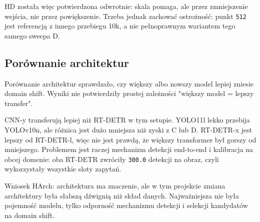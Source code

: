 \documentclass[
  11pt,
]{article}
\begin{document}
HD została więc potwierdzona odwrotnie: skala pomaga, ale przez
zmniejszenie wejścia, nie przez powiększenie. Trzeba jednak zachować
ostrożność: punkt \texttt{512} jest referencją z innego przebiegu 10k, a
nie pełnoprawnym wariantem tego samego sweepa D.

\hypertarget{poruxf3wnanie-architektur}{%
\subsection{Porównanie architektur}\label{poruxf3wnanie-architektur}}

Porównanie architektur sprawdzało, czy większy albo nowszy model lepiej
zniesie domain shift. Wyniki nie potwierdziły prostej zależności
"większy model = lepszy transfer".

\begingroup
{}
\noindent{}
\endgroup


CNN-y transferują lepiej niż RT-DETR w tym setupie. YOLO11l lekko
przebija YOLOv10n, ale różnica jest dużo mniejsza niż zyski z C lub D.
RT-DETR-x jest lepszy od RT-DETR-l, więc nie jest prawdą, że większy
transformer był gorszy od mniejszego. Problemem jest raczej mechanizm
detekcji end-to-end i kalibracja na obcej domenie: oba RT-DETR zwróciły
\texttt{300.0} detekcji na obraz, czyli wykorzystały wszystkie sloty
zapytań.

Wniosek HArch: architektura ma znaczenie, ale w tym projekcie zmiana
architektury była słabszą dźwignią niż skład danych. Najważniejsza nie
była pojemność modelu, tylko odporność mechanizmu detekcji i selekcji
kandydatów na domain shift.
\end{document}
